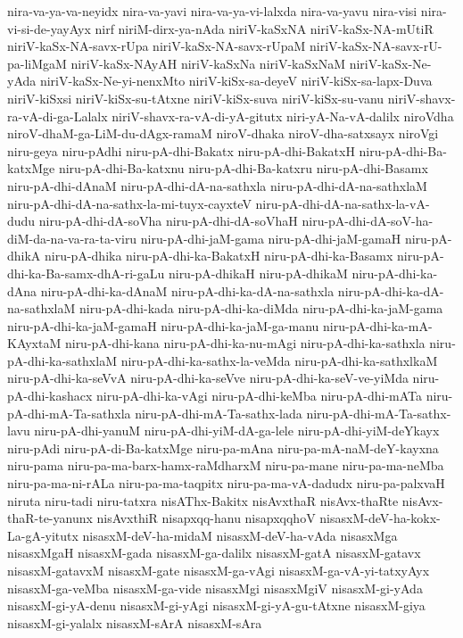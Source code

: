 {nira-va-ya-va-neyidx
nira-va-yavi
nira-va-ya-vi-lalxda
nira-va-yavu
nira-visi
nira-vi-si-de-yayAyx
nirf
niriM-dirx-ya-nAda
niriV-kaSxNA
niriV-kaSx-NA-mUtiR
niriV-kaSx-NA-savx-rUpa
niriV-kaSx-NA-savx-rUpaM
niriV-kaSx-NA-savx-rU-pa-liMgaM
niriV-kaSx-NAyAH
niriV-kaSxNa
niriV-kaSxNaM
niriV-kaSx-Ne-yAda
niriV-kaSx-Ne-yi-nenxMto
niriV-kiSx-sa-deyeV
niriV-kiSx-sa-lapx-Duva
niriV-kiSxsi
niriV-kiSx-su-tAtxne
niriV-kiSx-suva
niriV-kiSx-su-vanu
niriV-shavx-ra-vA-di-ga-Lalalx
niriV-shavx-ra-vA-di-yA-gitutx
niri-yA-Na-vA-dalilx
niroVdha
niroV-dhaM-ga-LiM-du-dAgx-ramaM
niroV-dhaka
niroV-dha-satxsayx
niroVgi
niru-geya
niru-pAdhi
niru-pA-dhi-Bakatx
niru-pA-dhi-BakatxH
niru-pA-dhi-Ba-katxMge
niru-pA-dhi-Ba-katxnu
niru-pA-dhi-Ba-katxru
niru-pA-dhi-Basamx
niru-pA-dhi-dAnaM
niru-pA-dhi-dA-na-sathxla
niru-pA-dhi-dA-na-sathxlaM
niru-pA-dhi-dA-na-sathx-la-mi-tuyx-cayxteV
niru-pA-dhi-dA-na-sathx-la-vA-dudu
niru-pA-dhi-dA-soVha
niru-pA-dhi-dA-soVhaH
niru-pA-dhi-dA-soV-ha-diM-da-na-va-ra-ta-viru
niru-pA-dhi-jaM-gama
niru-pA-dhi-jaM-gamaH
niru-pA-dhikA
niru-pA-dhika
niru-pA-dhi-ka-BakatxH
niru-pA-dhi-ka-Basamx
niru-pA-dhi-ka-Ba-samx-dhA-ri-gaLu
niru-pA-dhikaH
niru-pA-dhikaM
niru-pA-dhi-ka-dAna
niru-pA-dhi-ka-dAnaM
niru-pA-dhi-ka-dA-na-sathxla
niru-pA-dhi-ka-dA-na-sathxlaM
niru-pA-dhi-kada
niru-pA-dhi-ka-diMda
niru-pA-dhi-ka-jaM-gama
niru-pA-dhi-ka-jaM-gamaH
niru-pA-dhi-ka-jaM-ga-manu
niru-pA-dhi-ka-mA-KAyxtaM
niru-pA-dhi-kana
niru-pA-dhi-ka-nu-mAgi
niru-pA-dhi-ka-sathxla
niru-pA-dhi-ka-sathxlaM
niru-pA-dhi-ka-sathx-la-veMda
niru-pA-dhi-ka-sathxlkaM
niru-pA-dhi-ka-seVvA
niru-pA-dhi-ka-seVve
niru-pA-dhi-ka-seV-ve-yiMda
niru-pA-dhi-kashacx
niru-pA-dhi-ka-vAgi
niru-pA-dhi-keMba
niru-pA-dhi-mATa
niru-pA-dhi-mA-Ta-sathxla
niru-pA-dhi-mA-Ta-sathx-lada
niru-pA-dhi-mA-Ta-sathx-lavu
niru-pA-dhi-yanuM
niru-pA-dhi-yiM-dA-ga-lele
niru-pA-dhi-yiM-deYkayx
niru-pAdi
niru-pA-di-Ba-katxMge
niru-pa-mAna
niru-pa-mA-naM-deY-kayxna
niru-pama
niru-pa-ma-barx-hamx-raMdharxM
niru-pa-mane
niru-pa-ma-neMba
niru-pa-ma-ni-rALa
niru-pa-ma-taqpitx
niru-pa-ma-vA-dadudx
niru-pa-palxvaH
niruta
niru-tadi
niru-tatxra
nisAThx-Bakitx
nisAvxthaR
nisAvx-thaRte
nisAvx-thaR-te-yanunx
nisAvxthiR
nisapxqq-hanu
nisapxqqhoV
nisasxM-deV-ha-kokx-La-gA-yitutx
nisasxM-deV-ha-midaM
nisasxM-deV-ha-vAda
nisasxMga
nisasxMgaH
nisasxM-gada
nisasxM-ga-dalilx
nisasxM-gatA
nisasxM-gatavx
nisasxM-gatavxM
nisasxM-gate
nisasxM-ga-vAgi
nisasxM-ga-vA-yi-tatxyAyx
nisasxM-ga-veMba
nisasxM-ga-vide
nisasxMgi
nisasxMgiV
nisasxM-gi-yAda
nisasxM-gi-yA-denu
nisasxM-gi-yAgi
nisasxM-gi-yA-gu-tAtxne
nisasxM-giya
nisasxM-gi-yalalx
nisasxM-sArA
nisasxM-sAra
}
